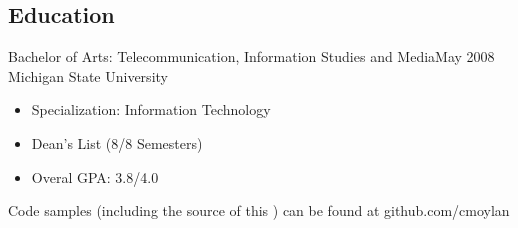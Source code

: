 \documentclass[11pt]{res}
\begin{document}
\begin{resume}


\section{Education}
Bachelor of Arts: Telecommunication, Information Studies and Media\dotfill May 2008\\
Michigan State University
\begin{itemize}
\item Specialization: Information Technology
\item Dean's List (8/8 Semesters)
\item Overal GPA: 3.8/4.0
\end{itemize}




\center\footnotesize Code samples (including the source of this \Resume) can be found at github.com/cmoylan

\end{resume}
\end{document}
